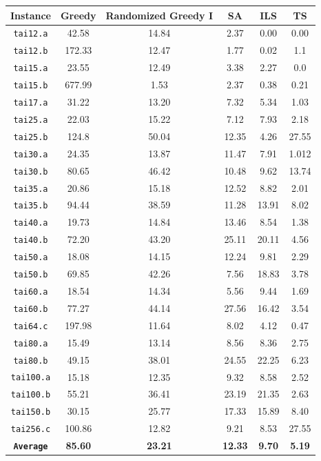 \documentclass[a4paper,10pt]{article}
\begin{document}
\begin{center}
\begin{tabular}{||c c c c c c ||} 
 \hline
 \textbf{Instance} & \textbf{Greedy} & \textbf{Randomized Greedy I} & \textbf{SA} & \textbf{ILS} & \textbf{TS} \\ [0.5ex] 
 \hline\hline
 \texttt{tai12.a} & 42.58 & 14.84 & 2.37 & 0.00 & 0.00\\ 
 \hline
 \texttt{tai12.b} & 172.33 & 12.47 & 1.77 & 0.02 & 1.1\\ 
 \hline
 \texttt{tai15.a} & 23.55 & 12.49 & 3.38 & 2.27 & 0.0\\ 
 \hline
 \texttt{tai15.b} & 677.99 & 1.53 & 2.37 & 0.38 & 0.21 \\ 
 \hline
 \texttt{tai17.a} & 31.22 & 13.20 & 7.32 & 5.34 & 1.03\\ 
 \hline
 \texttt{tai25.a} & 22.03 & 15.22 & 7.12 & 7.93 & 2.18\\ 
 \hline
 \texttt{tai25.b} & 124.8 & 50.04 & 12.35 & 4.26 & 27.55\\ 
 \hline
 \texttt{tai30.a} & 24.35 & 13.87 & 11.47 & 7.91 & 1.012\\ 
 \hline
 \texttt{tai30.b} & 80.65 & 46.42 & 10.48 & 9.62 & 13.74\\ 
 \hline
 \texttt{tai35.a} & 20.86 & 15.18 & 12.52 & 8.82 & 2.01\\ 
 \hline
 \texttt{tai35.b} & 94.44 & 38.59 & 11.28 & 13.91 & 8.02\\ 
 \hline
 \texttt{tai40.a} & 19.73 & 14.84 & 13.46 & 8.54 & 1.38\\ 
 \hline
 \texttt{tai40.b} & 72.20 & 43.20 & 25.11 & 20.11 & 4.56\\ 
 \hline
 \texttt{tai50.a} & 18.08 & 14.15 & 12.24 & 9.81 & 2.29\\ 
 \hline
 \texttt{tai50.b} & 69.85 & 42.26 & 7.56 & 18.83 & 3.78\\ 
 \hline
 \texttt{tai60.a} & 18.54 & 14.34 & 5.56 & 9.44 & 1.69\\ 
 \hline
 \texttt{tai60.b} &  77.27 & 44.14 & 27.56 & 16.42 & 3.54\\ 
 \hline
 \texttt{tai64.c} & 197.98 & 11.64 & 8.02 & 4.12 & 0.47\\ 
 \hline
 \texttt{tai80.a} & 15.49 & 13.14 & 8.56 & 8.36 & 2.75\\ 
 \hline
 \texttt{tai80.b} & 49.15 & 38.01 & 24.55 & 22.25 & 6.23\\ 
 \hline
 \texttt{tai100.a} & 15.18 & 12.35 & 9.32 & 8.58 & 2.52\\ 
 \hline
 \texttt{tai100.b} & 55.21 & 36.41 & 23.19 & 21.35 & 2.63\\
 \hline
 \texttt{tai150.b} & 30.15 & 25.77 & 17.33 & 15.89 & 8.40\\ 
 \hline
 \texttt{tai256.c} & 100.86 & 12.82 & 9.21 & 8.53 & 27.55\\ 
 \hline
 \texttt{\textbf{Average}} & \textbf{85.60} & \textbf{23.21} & \textbf{12.33} & \textbf{9.70} & \textbf{5.19} \\ 
 \hline
\end{tabular}
\end{center}
\end{document}
